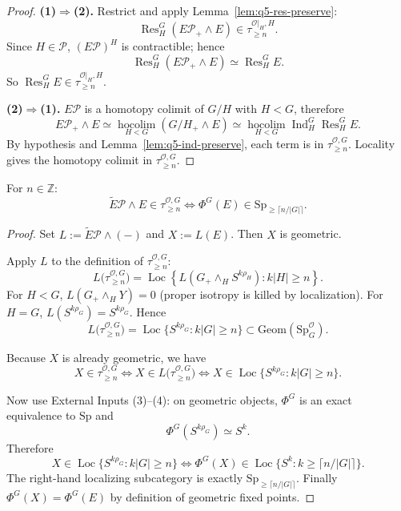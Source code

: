 \begin{proof}
\textbf{(1)$\Rightarrow$(2).}
Restrict and apply Lemma~\ref{lem:q5-res-preserve}:
\[
\operatorname{Res}^G_H(E\mathcal P_+\wedge E)\in\tau^{\mathcal O|_H,H}_{\ge n}.
\]
Since $H\in\mathcal P$, $(E\mathcal P)^H$ is contractible; hence
\[
\operatorname{Res}^G_H(E\mathcal P_+\wedge E)\simeq \operatorname{Res}^G_H E.
\]
So $\operatorname{Res}^G_H E\in\tau^{\mathcal O|_H,H}_{\ge n}$.

\textbf{(2)$\Rightarrow$(1).}
$E\mathcal P$ is a homotopy colimit of $G/H$ with $H<G$, therefore
\[
E\mathcal P_+\wedge E
\simeq
\operatorname*{hocolim}_{H<G}(G/H_+\wedge E)
\simeq
\operatorname*{hocolim}_{H<G}\operatorname{Ind}^G_H\operatorname{Res}^G_H E.
\]
By hypothesis and Lemma~\ref{lem:q5-ind-preserve}, each term is in $\tau^{\mathcal O,G}_{\ge n}$.
Locality gives the homotopy colimit in $\tau^{\mathcal O,G}_{\ge n}$.
\end{proof}

\begin{lemma}\label{lem:q5-geometric-piece}
For $n\in\mathbb Z$:
\[
\widetilde E\mathcal P\wedge E\in\tau^{\mathcal O,G}_{\ge n}
\Longleftrightarrow
\Phi^G(E)\in\mathrm{Sp}_{\ge \lceil n/|G|\rceil}.
\]
\end{lemma}

\begin{proof}
Set $L:=\widetilde E\mathcal P\wedge(-)$ and $X:=L(E)$.
Then $X$ is geometric.

Apply $L$ to the definition of $\tau^{\mathcal O,G}_{\ge n}$:
\[
L\bigl(\tau^{\mathcal O,G}_{\ge n}\bigr)
=
\operatorname{Loc}
\left\{
L\!\left(G_+\wedge_H S^{k\rho_H}\right): k|H|\ge n
\right\}.
\]
For $H<G$, $L(G_+\wedge_H Y)=0$ (proper isotropy is killed by localization).
For $H=G$, $L(S^{k\rho_G})=S^{k\rho_G}$.
Hence
\[
L\bigl(\tau^{\mathcal O,G}_{\ge n}\bigr)
=
\operatorname{Loc}\{S^{k\rho_G}:k|G|\ge n\}
\subset \mathrm{Geom}(\mathrm{Sp}^{\mathcal O}_G).
\]

Because $X$ is already geometric, we have
\[
X\in\tau^{\mathcal O,G}_{\ge n}
\iff
X\in L\bigl(\tau^{\mathcal O,G}_{\ge n}\bigr)
\iff
X\in \operatorname{Loc}\{S^{k\rho_G}:k|G|\ge n\}.
\]

Now use External Inputs (3)--(4): on geometric objects, $\Phi^G$ is an exact equivalence to $\mathrm{Sp}$ and
\[
\Phi^G(S^{k\rho_G})\simeq S^k.
\]
Therefore
\[
X\in \operatorname{Loc}\{S^{k\rho_G}:k|G|\ge n\}
\iff
\Phi^G(X)\in \operatorname{Loc}\{S^k:k\ge\lceil n/|G|\rceil\}.
\]
The right-hand localizing subcategory is exactly $\mathrm{Sp}_{\ge\lceil n/|G|\rceil}$.
Finally $\Phi^G(X)=\Phi^G(E)$ by definition of geometric fixed points.
\end{proof}

